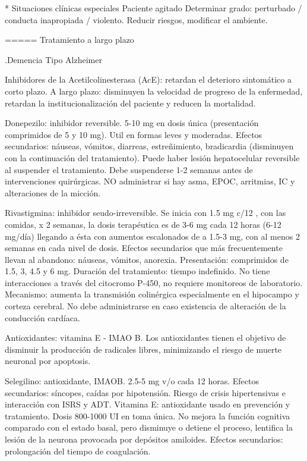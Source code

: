 \documentclass[encares.tex]{subfiles}
\begin{document}
* Situaciones clínicas especiales Paciente agitado Determinar grado: perturbado / conducta inapropiada / violento. Reducir riesgos, modificar el ambiente.

===== Tratamiento a largo plazo

.Demencia Tipo Alzheimer

Inhibidores de la Acetilcolinesterasa (AcE): retardan el deterioro sintomático a corto plazo. A largo plazo: disminuyen la velocidad de progreso de la enfermedad, retardan la institucionalización del paciente y reducen la mortalidad.

Donepezilo: inhibidor reversible. 5-10 mg en dosis única (presentación comprimidos de 5 y 10 mg). Util en formas leves y moderadas. Efectos secundarios: náuseas, vómitos, diarreas, estreñimiento, bradicardia (disminuyen con la continuación del tratamiento). Puede haber lesión hepatocelular reversible al suspender el tratamiento. Debe suspenderse 1-2 semanas antes de intervenciones quirúrgicas. NO administrar si hay asma, EPOC, arritmias, IC y alteraciones de la micción.

Rivastigmina: inhibidor seudo-irreversible. Se inicia con 1.5 mg c/12 , con las comidas, x 2 semanas, la dosis terapéutica es de 3-6 mg cada 12 horas (6-12 mg/día) llegando a ésta con aumentos escalonados de a 1.5-3 mg, con al menos 2 semanas en cada nivel de dosis. Efectos secundarios que más frecuentemente llevan al abandono: náuseas, vómitos, anorexia. Presentación: comprimidos de 1.5, 3, 4.5 y 6 mg. Duración del tratamiento: tiempo indefinido. No tiene interacciones a través del citocromo P-450, no requiere monitoreos de laboratorio. Mecanismo: aumenta la transmisión colinérgica especialmente en el hipocampo y corteza cerebral. No debe administrarse en caso existencia de alteración de la conducción cardíaca.

Antioxidantes: vitamina E - IMAO B. Los antioxidantes tienen el objetivo de disminuir la producción de radicales libres, minimizando el riesgo de muerte neuronal por apoptosis.

Selegilino: antioxidante, IMAOB. 2.5-5 mg v/o cada 12 horas. Efectos secundarios: síncopes, caídas por hipotensión. Riesgo de crisis hipertensivas e interacción con ISRS y ADT. Vitamina E: antioxidante usado en prevención y tratamiento. Dosis 800-1000 UI en toma única. No mejora la función cognitiva comparado con el estado basal, pero disminuye o detiene el proceso, lentifica la lesión de la neurona provocada por depósitos amiloides. Efectos secundarios: prolongación del tiempo de coagulación.
\end{document}
